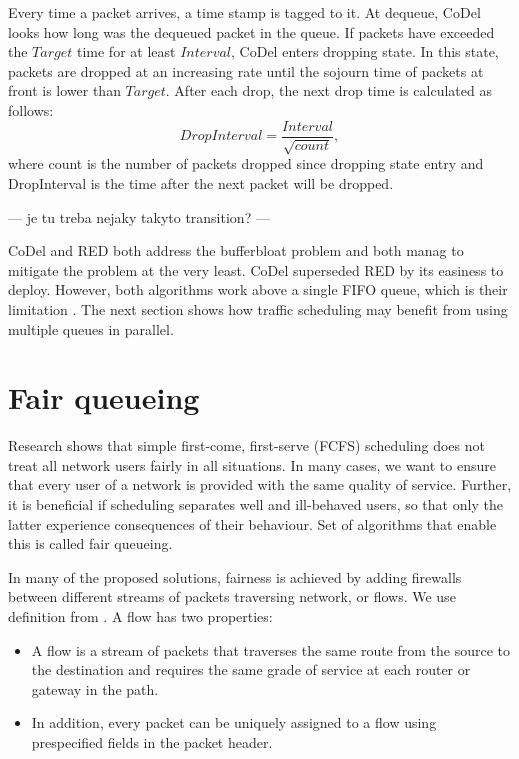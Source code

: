 Every time a packet arrives, a time stamp is tagged to it. At dequeue, CoDel looks how long was the dequeued packet in the queue. If packets have exceeded the $Target$ time for at least $Interval$, CoDel enters dropping state. In this state, packets are dropped at an increasing rate until the sojourn time of packets at front is lower than $Target$. After each drop, the next drop time is calculated as follows:
\[
  DropInterval = \frac{Interval}{\sqrt{count}},
\]
where count is the number of packets dropped since dropping state entry and DropInterval is the time after the next packet will be dropped.



--- je tu treba nejaky takyto transition? --- 
 
CoDel and RED both address the bufferbloat problem and both manag to mitigate the problem at the very least. CoDel superseded RED by its easiness to deploy. However, both algorithms work above a single FIFO queue, which is their limitation . The next section shows how traffic scheduling may benefit from using multiple queues in parallel.

\section{Fair queueing}

Research shows  that simple first-come, first-serve (FCFS) scheduling does not treat all network users fairly in all situations. In many cases, we want to ensure that every user of a network is provided with the same quality of service. Further, it is beneficial if scheduling separates well and ill-behaved users, so that only the latter experience consequences of their behaviour. Set of  algorithms that enable this is called fair queueing.

In many of the proposed solutions, fairness is achieved by adding firewalls  between different streams of packets traversing network, or flows. We use definition from \cite{Zhang:1990:VCN:99517.99525}. A flow has two properties:
\begin{itemize}
	\item A flow is a stream of packets that traverses the same route from the source to the destination and requires the same grade of service at each router or gateway in the path.
	\item In addition, every packet can be uniquely assigned to a flow using prespecified fields in the packet header.
\end{itemize}
 
